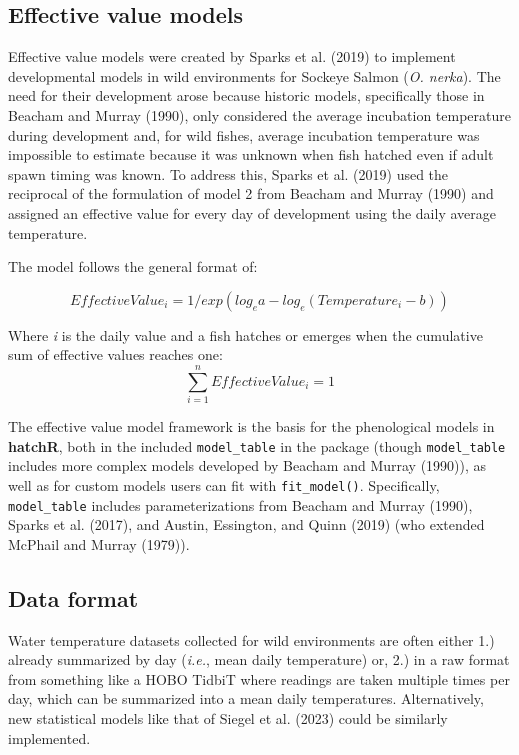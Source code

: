 \documentclass[webpdf,large,contemporary,namedate]{oup-authoring-template}
\theoremstyle{thmstyleone}
\theoremstyle{thmstyletwo}
\theoremstyle{thmstylethree}
\begin{document}
\subsection{Effective value models}\label{effective-value-models}

Effective value models were created by Sparks et al. (2019) to implement
developmental models in wild environments for Sockeye Salmon (\emph{O.
nerka}). The need for their development arose because historic models,
specifically those in Beacham and Murray (1990), only considered the
average incubation temperature during development and, for wild fishes,
average incubation temperature was impossible to estimate because it was
unknown when fish hatched even if adult spawn timing was known. To
address this, Sparks et al. (2019) used the reciprocal of the
formulation of model 2 from Beacham and Murray (1990) and assigned an
effective value for every day of development using the daily average
temperature.

The model follows the general format of:

\[
Effective Value_i = 1/exp(log_ea - log_e(Temperature_i - b))
\]

Where \emph{i} is the daily value and a fish hatches or emerges when the
cumulative sum of effective values reaches one:
\[\sum_{i =1}^nEffectiveValue_i = 1\]

The effective value model framework is the basis for the phenological
models in \textbf{hatchR}, both in the included \texttt{model\_table} in
the package (though \texttt{model\_table} includes more complex models
developed by Beacham and Murray (1990)), as well as for custom models
users can fit with \texttt{fit\_model()}. Specifically,
\texttt{model\_table} includes parameterizations from Beacham and Murray
(1990), Sparks et al. (2017), and Austin, Essington, and Quinn (2019)
(who extended McPhail and Murray (1979)).

\subsection{Data format}\label{data-format}

Water temperature datasets collected for wild environments are often
either 1.) already summarized by day (\emph{i.e.}, mean daily
temperature) or, 2.) in a raw format from something like a HOBO TidbiT
where readings are taken multiple times per day, which can be summarized
into a mean daily temperatures. Alternatively, new statistical models
like that of Siegel et al. (2023) could be similarly implemented.
\end{document}
